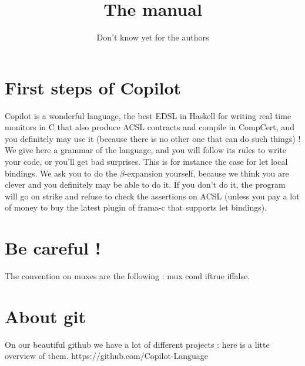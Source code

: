 \documentclass[11pt]{article}
\begin{document}
\title{The manual}
\author{Don't know yet for the authors}

\maketitle
\section{First steps of Copilot}
Copilot is a wonderful language, the best EDSL in Haskell for writing real time monitors in C that also produce ACSL contracts and compile in CompCert, and you definitely may use it (because there is no other one that can do such things) ! We give here a grammar of the language, and you will follow its rules to write your code, or you'll get bad surprises. This is for instance the case for let local bindings. We ask you to do the $\beta$-expansion yourself, because we think you are clever and you definitely may be able to do it. If you don't do it, the program will go on strike and refuse to check the assertions on ACSL (unless you pay a lot of money to buy the latest plugin of frama-c that supports let bindings).

\section{Be careful !}

The convention on muxes are the following : mux cond iftrue iffalse.

\section{About git}
On our beautiful github we have a lot of different projects : here is a litte overview of them.
https://github.com/Copilot-Language
\end{document}
